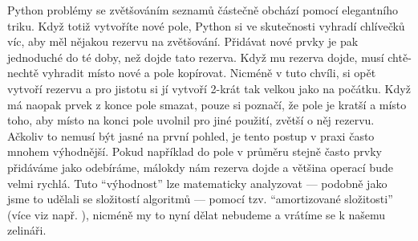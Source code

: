 \begin{center}
\begin{minipage}{5cm}
\end{minipage}
\end{center}


Python problémy se zvětšováním seznamů částečně obchází pomocí elegantního triku. Když totiž vytvoříte nové pole, Python si ve skutečnosti vyhradí chlívečků víc,
aby měl nějakou rezervu na zvětšování. Přidávat nové prvky je pak jednoduché do té doby, než dojde tato rezerva. Když mu rezerva dojde, musí chtě-nechtě
vyhradit místo nové a pole kopírovat. Nicméně v tuto chvíli, si opět vytvoří rezervu a pro jistotu si jí vytvoří 2-krát tak velkou jako na počátku.
Když má naopak prvek z konce pole smazat, pouze si poznačí, že pole je kratší a místo toho, aby místo na konci pole uvolnil pro jiné použití,
zvětší o něj rezervu. Ačkoliv to nemusí být jasné na první pohled, je tento postup v praxi často mnohem výhodnější. Pokud například do pole v průměru stejně 
často prvky přidáváme jako odebíráme, málokdy nám rezerva dojde a většina operací bude velmi rychlá. Tuto ``výhodnost'' lze matematicky analyzovat ---
podobně jako jsme to udělali se složitostí algoritmů --- pomocí tzv. ``amortizované složitosti'' (více viz např. \cite{Tarjan:1985}), nicméně my to nyní
dělat nebudeme a vrátíme se k našemu zelináři.

